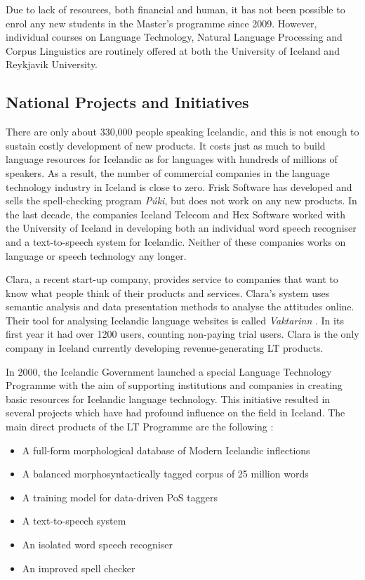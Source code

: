 \documentclass{../../metanetpaper}
\begin{document}
\begin{multicols}{2}
Due to lack of resources, both financial and human, it has not been possible to enrol any new students in the Master’s programme since 2009. However, individual courses on Language Technology, Natural Language Processing and Corpus Linguistics are routinely offered at both the University of Iceland and Reykjavik University.

\subsection{National Projects and Initiatives}

There are only about 330,000 people speaking Icelandic, and this is not enough to sustain costly development of new products. It costs just as much to build language resources for Icelandic as for languages with hundreds of millions of speakers. As a result, the number of commercial companies in the language technology industry in Iceland is close to zero. Frisk Software has developed and sells the spell-checking program \textit{Púki}, but does not work on any new products. In the last decade, the companies Iceland Telecom and Hex Software worked with the University of Iceland in developing both an individual word speech recogniser and a text-to-speech system for Icelandic. Neither of these companies works on language or speech technology any longer.

Clara, a recent start-up company, provides service to companies that want to know what people think of their products and services. Clara’s system uses semantic analysis and data presentation methods to analyse the attitudes online. Their tool for analysing Icelandic language websites is called \textit{Vaktarinn} \cite{vak1}.  In its first year it had over 1200 users, counting non-paying trial users. Clara is the only company in Iceland currently developing revenue-generating LT products.

In 2000, the Icelandic Government launched a special Language Technology Programme with the aim of supporting institutions and companies in creating basic resources for Icelandic language technology. This initiative resulted in several projects which have had profound influence on the field in Iceland. The main direct products of the LT Programme are the following \cite{ilrt1}: 

\begin{itemize}
\item A full-form morphological database of Modern Icelandic inflections
\item A balanced morphosyntactically tagged corpus of 25 million words
\item A training model for data-driven PoS taggers
\item A text-to-speech system
\item An isolated word speech recogniser
\item An improved spell checker
\end{itemize}


\end{multicols}
\end{document}
